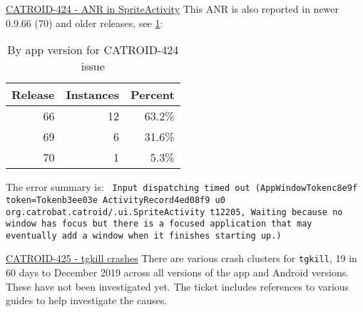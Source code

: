 \href{https://jira.catrob.at/browse/CATROID-424}{CATROID-424 - ANR in SpriteActivity} This ANR is also reported in newer 0.9.66 (70) and older releases, see \ref{tab:catroid_424}:
\begin{table}[ht]
    \centering
    \begin{tabular}{r|r|r}
Release	&Instances	&Percent \\
\hline
66	&12	&63.2\% \\
69	&6	&31.6\% \\
70	&1	&5.3\% \\
    \end{tabular}
    \caption{By app version for CATROID-424 issue}
    \label{tab:catroid_424}
\end{table}

The error summary is:
\texttt{\small{
Input dispatching timed out (AppWindowToken{c8e9f token=Token{b3ee03e ActivityRecord{4ed08f9 u0 org.catrobat.catroid/.ui.SpriteActivity t12205}}}, Waiting because no window has focus but there is a focused application that may eventually add a window when it finishes starting up.)}}

\href{https://jira.catrob.at/browse/CATROID-425}{CATROID-425 - tgkill crashes} There are various crash clusters for \texttt{tgkill}, 19 in 60 days to  December 2019 across all versions of the app and Android versions. These have not been investigated yet. The ticket includes references to various guides to help investigate the causes.

